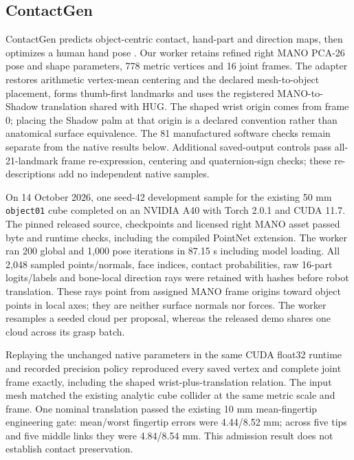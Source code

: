 \documentclass[10pt,letterpaper]{article}
\begin{document}

\subsection{ContactGen}
ContactGen predicts object-centric contact, hand-part and direction maps,
then optimizes a human hand pose \cite{contactgen}. Our worker retains refined
right MANO PCA-26 pose and shape parameters, 778 metric vertices and 16 joint
frames. The adapter restores arithmetic vertex-mean centering and the declared
mesh-to-object placement, forms thumb-first landmarks and uses the registered
MANO-to-Shadow translation shared with HUG. The shaped wrist origin comes from
frame 0; placing the Shadow palm at that origin is a declared convention rather
than anatomical surface equivalence. The 81 manufactured software checks remain
separate from the native results below. Additional saved-output controls pass
all-21-landmark frame re-expression, centering and quaternion-sign checks;
these re-descriptions add no independent native samples.

On 14 October 2026, one seed-42 development sample for the existing 50 mm
\texttt{object01} cube completed on an NVIDIA A40 with Torch 2.0.1 and CUDA 11.7.
The pinned released source, checkpoints and licensed right MANO asset passed
byte and runtime checks, including the compiled PointNet extension. The worker
ran 200 global and 1,000 pose iterations in 87.15 s including model loading.
All 2,048 sampled points/normals, face indices, contact probabilities, raw
16-part logits/labels and bone-local direction rays were retained with hashes
before robot translation. These rays point from assigned MANO frame origins
toward object points in local axes; they are neither surface normals nor forces.
The worker resamples a seeded cloud per proposal, whereas the released demo
shares one cloud across its grasp batch.

Replaying the unchanged native parameters in the same CUDA float32 runtime and
recorded precision policy reproduced every saved vertex and complete joint
frame exactly, including the shaped wrist-plus-translation relation. The input
mesh matched the existing analytic cube collider at the same metric scale and
frame. One nominal translation passed the existing 10 mm mean-fingertip
engineering gate: mean/worst fingertip errors were 4.44/8.52 mm; across five tips
and five middle links they were 4.84/8.54 mm. This admission result does not
establish contact preservation.
\end{document}
